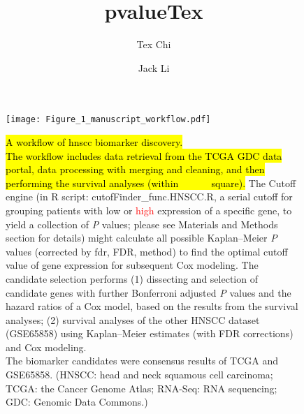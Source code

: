 \documentclass{article}
\author[1]{Tex Chi}
\author[1]{Jack Li}
\affil[1]{Institute of LaTeX}
\title{pvalueTex}
\begin{document}
\maketitle


\begin{figure}[ht]
\texttt{[image: Figure\_1\_manuscript\_workflow.pdf]} %
\caption{\hl{A workflow of \acrshort{hnscc} biomarker discovery.\\
The workflow includes data retrieval from the TCGA GDC data portal, data processing with merging and cleaning, and then performing the survival analyses (within \textcolor{yellow}{yellow} square).} The Cutoff engine (in R script: cutofFinder\_func.HNSCC.R, a serial cutoff for grouping patients with \textcolor{asparagus}{low} or \textcolor{red}{high} expression of a specific gene, to yield a collection of \protect\textit{P} values; please see Materials and Methods section for details) might calculate all possible Kaplan--Meier \protect\textit{P} values (corrected by \acrlong{fdr}, FDR, method) to find the optimal cutoff value of gene expression for subsequent Cox modeling. The candidate selection performs (1) dissecting and selection of candidate genes with further Bonferroni adjusted \protect\textit{P} values and the hazard ratios of a Cox model, based on the results from the survival analyses; (2) survival analyses of the other HNSCC dataset (GSE65858) using Kaplan--Meier estimates (with FDR corrections) and Cox modeling.\\ The biomarker candidates were consensus results of TCGA and GSE65858. (HNSCC: head and neck squamous cell carcinoma; TCGA: the Cancer Genome Atlas; RNA-Seq: RNA sequencing; GDC: Genomic Data Commons.)}  %


\end{figure}
\end{document}
